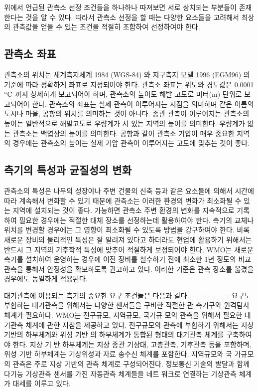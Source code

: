 위에서 언급된 관측소 선정 조건들을 하나하나 따져보면 서로 상치되는 부분들이 존재한다는 것을 알 수 있다. 따라서 관측소 선정을 할 때는 다양한 요소들을 고려해서 최상의 관측값을 얻을 수 있는 조건을 적절히 조합하여 선정하여야 한다.

\subsection{관측소 좌표}
관측소의 위치는 세계측지체계 1984 (WGS-84) 와 지구측지 모델 1996 (EGM96) 의 기준에 따라 정확하게 좌표로 지정되어야 한다. 관측소 좌표는 위도와 경도값은 0.0001 $\rm ^{\circ}C$ 까지 상세하게 보고되어야 하며, 관측소의 높이도 해발 고도로 미터(m) 단위로 보고되어야 한다. 관측소의 좌표는 실제 관측이 이루어지는 지점을 의미하며 같은 이름의 도시나 마을, 공항의 위치를 의미하는 것이 아니다. 종관 관측이 이루어지는 관측소의 높이는 일반적으로 해발고도로 우량계가 서 있는 지역의 높이를 의미한다. 우량계가 없는 관측소는 백엽상의 높이를 의미한다. 공항과 같이 관측소 기압이 매우 중요한 지역의 경우에는 관측소의 높이는 실제 기압 관측이 이루어지는 고도에 맞추는 것이 좋다.

\subsection{측기의 특성과 균질성의 변화}
관측소의 특성은 나무의 성장이나 주변 건물의 신축 등과 같은 요소들에 의해서 시간에 따라 계속해서 변화할 수 있기 때문에 관측소는 이러한 환경의 변화가 최소화될 수 있는 지역에 설치되는 것이 좋다. 가능하면 관측소 주변 환경의 변화를 지속적으로 기록하여 필요한 경우에는 적절한 대체 장소를 선정하는데 활용하여야 한다. 측기의 교체나 위치를 변경할 경우에는 그 영향이 최소화될 수 있도록 방법을 강구하여야 한다. 비록 새로운 장비의 물리적인 특성은 잘 알려져 있다고 하더라도 현업에 활용하기 위해서는 반드시 그 지역의 기후학적 특성에 맞추어 적절하게 보정되어야 한다.
WMO는 새로운 측기를 설치하여 운영하는 경우에 이전 장비를 철수하기 전에 최소한 1년 정도의 비교 관측을 통해서 안정성을 확보하도록 권고하고 있다. 이러한 기준은 관측 장소를 옮겼을 경우에도 동일하게 적용된다.

대기관측에 이용되는 측기의 중요한 요구 조건들은 다음과 같다.
=======
요구도 부합하는 대기관측을 위해서는 다양한 센서들을 구비한 적절한 관
측기구와 원격탐사 체계가 필요하다. WMO는 전구규모, 지역규모, 국가규
모의 관측을 위해서 필요한 대기관측 체계에 관한 지침을 제공하고 있다.
전구규모의 관측에 부합하기 위해서는 지상 기반의 하부체계와 위성 기반
의 하부체계가 통합된 형태의 대기관측 체계를 구축하여야 한다. 지상 기
반 하부체계는 지상 종관 기상대, 고층관측, 기후관측 등을 포함하며, 위성
기반 하부체계는 기상위성과 자료 송수신 체계를 포함한다. 지역규모와 국
가규모의 관측은 주로 지상 기반의 관측 체계로 구성되어진다. 정보통신
기술의 발달과 함께 다기능 기상관측 센서를 가진 자동관측 체계들을 네트
워크로 연결하는 기상관측 체계가 대세를 이루고 있다.


